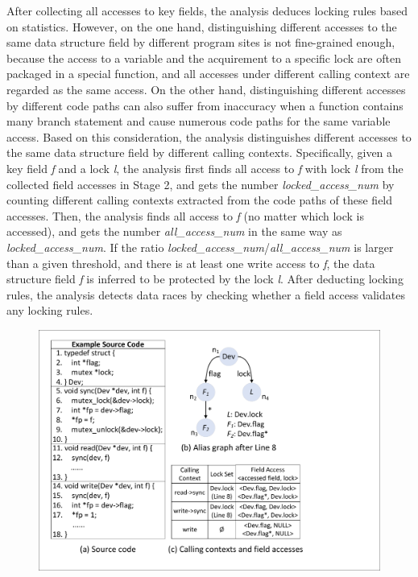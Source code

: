  After collecting all accesses to key fields, 
the analysis deduces locking rules based on statistics. However, on the one 
hand, distinguishing different accesses to the same data structure field by 
different program sites is not fine-grained enough, because the access to a 
variable and the acquirement to a specific lock are often packaged in a special 
function, and all accesses under different calling context are regarded as the 
same access. On the other hand, distinguishing different accesses by different 
code paths can also suffer from inaccuracy when a function contains many branch 
statement and cause numerous code paths for the same variable access. Based on 
this consideration, the analysis distinguishes different accesses to the same 
data structure field by different calling contexts. Specifically, given a key 
field {\em f} and a lock {\em l}, the analysis first finds all access to {\em 
f} with lock {\em l} from the collected field accesses in Stage 2, and gets the 
number {\em locked\_access\_num} by counting different calling contexts 
extracted from the code paths of these field accesses. Then, the analysis finds 
all access to {\em f} (no matter which lock is accessed), and gets the number 
{\em all\_access\_num} in the same way as {\em locked\_access\_num}. If the 
ratio {\em locked\_access\_num}/{\em all\_access\_num} is larger than a given 
threshold, and there is at least one write access to {\em f}, the data 
structure field {\em f} is inferred to be protected by the lock {\em l}. After 
deducting locking rules, the analysis detects data races by checking whether a 
field access validates any locking rules.

\begin{figure}[htbp]
	\centering
	\includegraphics[width=1\linewidth]{figures/fig_demo_rule_mining.pdf}
	\label{fig_demo_rule_mining}
\end{figure}


